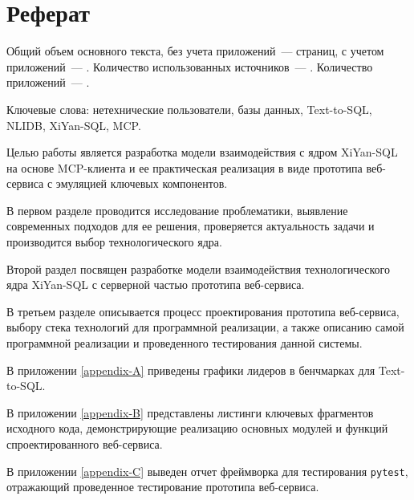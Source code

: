\chapter*{Реферат}
\thispagestyle{plain}

Общий объем основного текста, без учета приложений~---
\pageref{end_of_main_text} страниц, с учетом приложений~---
\pageref{end_of_document}. Количество использованных источников~---
\hyperref[sec:bibliography]{}. Количество приложений~---
\hyperref[sec:appendices]{}.

Ключевые слова: нетехнические пользователи, базы данных, Text-to-SQL, NLIDB, XiYan-SQL, MCP.

Целью работы является разработка модели взаимодействия с ядром XiYan-SQL на основе MCP-клиента и
ее практическая реализация в виде прототипа веб-сервиса с эмуляцией ключевых компонентов.

В первом разделе проводится исследование проблематики, выявление современных подходов для ее решения,
проверяется актуальность задачи и производится выбор технологического ядра.

Второй раздел посвящен разработке модели взаимодействия технологического ядра XiYan-SQL с серверной частью
прототипа веб-сервиса.

В третьем разделе описывается процесс проектирования прототипа веб-сервиса,
выбору стека технологий для программной реализации, а также описанию самой программной реализации и
проведенного тестирования данной системы.

В приложении \ref{appendix-A} приведены графики лидеров в бенчмарках
для Text-to-SQL.

В приложении \ref{appendix-B} представлены листинги ключевых фрагментов исходного кода,
демонстрирующие реализацию основных модулей и функций спроектированного веб-сервиса.

В приложении \ref{appendix-C} выведен отчет фреймворка для тестирования \verb|pytest|,
отражающий проведенное тестирование прототипа веб-сервиса.